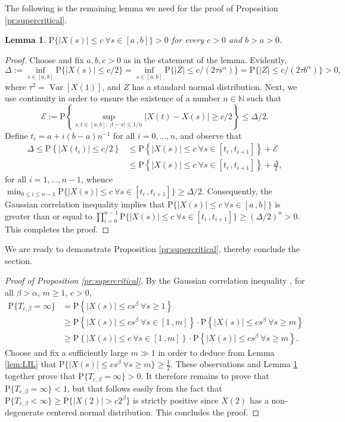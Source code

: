 \documentclass[reqno]{amsart}
\DeclareMathOperator{\Var}{Var}
\newcommand{\<}{\langle}
\renewcommand{\>}{\rangle}
\newcommand{\N}{\mathbb{N}}
\renewcommand{\P}{\mathrm{P}}
\newcommand{\1}{\mathbb{1}}
\renewcommand{\ge}{\geqslant}
\renewcommand{\le}{\leqslant}
\newtheorem{lemma}[stat]{Lemma}
\theoremstyle{definition}
\numberwithin{equation}{section}
\begin{document}
The following is the remaining lemma we need for the proof of Proposition
\ref{pr:supercritical}.

\begin{lemma}\label{lem:pos}
	$\P\{ |X(s)| \le c \ \forall s\in[a\,,b]\}>0$ for every $c>0$ and $b>a>0$.
\end{lemma}

\begin{proof}
	Choose and fix $a,b,c>0$ as in the statement of the lemma. Evidently,
	\[
		\Delta := \inf_{s\in[a,b]}\P\{|X(s)|\le c/2\} = 
		\inf_{s\in[a,b]}\P\{|Z|\le c/(2\tau s^\alpha)\} 
		= \P\{|Z| \le c/(2\tau b^\alpha)\}
		>0,
	\]
	where $\tau^2=\Var[X(1)]$,
	and $Z$ has a standard normal distribution. Next, we use continuity
	in order to ensure the existence of a number $n\in\N$
	such that
	\[\textstyle
		\mathscr{E}:=\P\left\{ \sup_{s,t\in[a,b]:\ |t-s|\le 1/n}
		|X(t) - X(s)| \ge c/2 \right\} \le \Delta/2.
	\]
	Define $t_i = a + i(b-a)n^{-1}$ for all $i=0,\ldots,n$, and observe that
	\begin{align*}
		\Delta \le \P\left\{ |X(t_i)|\le c/2 \right\}
		&\le \P\left\{ |X(s)|\le c \ \forall 
		s\in[t_i\,,t_{i+1}]\right\} + \mathscr{E}\\
		&\le \P\left\{ |X(s)|\le c \ \forall 
		s\in[t_i\,,t_{i+1}]\right\} + \frac{\Delta}{2},
	\end{align*}
	for all $i=1,\ldots,n-1$, whence
	$\min_{0\le i\le n-1}\P\{ |X(s)|\le c \ \forall  s\in[t_i\,,t_{i+1}]\}
	\ge \Delta/2.$
	Consequently, the Gaussian correlation inequality \cite{Royen,LatalaMatlak} 
	implies that $\P\{ |X(s)|\le c\ \forall s\in[a\,,b]\} $ is greater than or equal to
	$\prod_{i=0}^{n-1}\P\{ |X(s)|\le c \ \forall  s\in[t_i\,,t_{i+1}]\}\ge (\Delta/2)^n>0.$
	This completes the proof.
\end{proof}
 
 We are ready to demonstrate Proposition \ref{pr:supercritical}, thereby
 conclude the section.
 
 \begin{proof}[Proof of Proposition \ref{pr:supercritical}]
 	By the Gaussian correlation inequality
	\cite{Royen,LatalaMatlak}, for all $\beta>\alpha$, $m\ge1$, $c>0$,
 	\begin{align*}
	 	\P\{T_{c,\beta} =\infty\}	&=\P\left\{ |X(s)| \le cs^\beta\
			\forall s\ge1\right\}\\
			&\ge \P\left\{ |X(s)| \le cs^\beta\ \forall s\in[1\,,m]\right\}\cdot
			\P\left\{ |X(s)| \le c s^\beta\ \forall s\ge m\right\}\\
		&\ge \P\left\{ |X(s)| \le c\ \forall s\in[1\,,m]\right\}\cdot
			\P\left\{ |X(s)| \le c s^\beta\ \forall s\ge m\right\}.
	\end{align*}
	Choose and fix a sufficiently large $m\gg1$ in order to deduce
	from Lemma \ref{lem:LIL} that
	$\P\{ |X(s)| \le c s^\beta\ \forall s\ge m\}\ge\frac12.$
	These observations and Lemma \ref{lem:pos} together prove that
	$\P\{T_{c,\beta}=\infty\}>0$. It therefore remains to prove
	that $\P\{T_{c,\beta}=\infty\}<1$, but that follows easily
	from the fact that
	$\P\{T_{c,\beta}<\infty\}\ge \P\{|X(2)|>c2^\beta\}$ is strictly 
	positive since $X(2)$ has a non-degenerate centered normal distribution.
	This concludes the proof.
 \end{proof}
 
\end{document}
